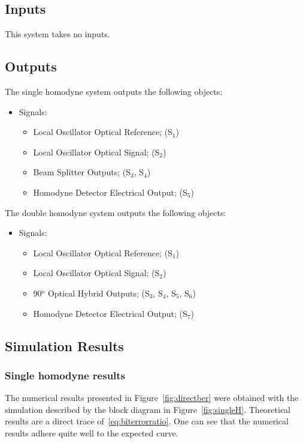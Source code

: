 \subsection*{Inputs}

This system takes no inputs.
%
\subsection*{Outputs}

The single homodyne system outputs the following objects:
\begin{itemize}
\item Signals:
\begin{itemize}
\item Local Oscillator Optical Reference; (S$_{1}$)
\item Local Oscillator Optical Signal; (S$_{2}$)
\item Beam Splitter Outputs; (S$_{3}$, S$_{4}$)
\item Homodyne Detector Electrical Output; (S$_{5}$)
\end{itemize}
\end{itemize}
\par
The double homodyne system outputs the following objects:
\begin{itemize}
\item Signals:
\begin{itemize}
\item Local Oscillator Optical Reference; (S$_{1}$)
\item Local Oscillator Optical Signal; (S$_{2}$)
\item 90$^\text{o}$ Optical Hybrid Outputs; (S$_{3}$, S$_{4}$, S$_{5}$, S$_{6}$)
\item Homodyne Detector Electrical Output; (S$_{7}$)
\end{itemize}
\end{itemize}		

\subsection*{Simulation Results}
\subsubsection*{Single homodyne results}\label{subsec:SHresults}

The numerical results presented in Figure~\ref{fig:directber} were obtained with the simulation described by the block diagram in Figure~\ref{fig:singleH}. Theoretical results are a direct trace of~\eqref{eq:biterrorratio}. One can see that the numerical results adhere quite well to the expected curve.

